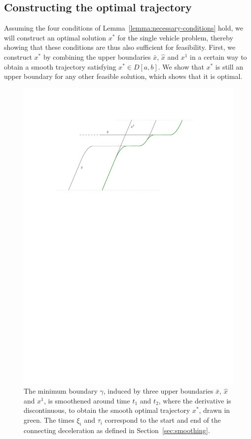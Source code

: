 \documentclass[a4paper]{article}
\theoremstyle{definition}
\theoremstyle{plain}
\begin{document}
\pagebreak

\subsection{Constructing the optimal trajectory}

Assuming the four conditions of Lemma~\ref{lemma:necessary-conditions} hold, we will construct an optimal
solution $x^{*}$ for the single vehicle problem, thereby showing that these
conditions are thus also sufficient for feasibility.
%
First, we construct $x^{*}$ by combining the upper boundaries $\bar{x}$,
$\hat{x}$ and $x^{1}$ in a certain way to obtain a smooth trajectory satisfying
$x^{*} \in D[a,b]$.
%
We show that $x^{*}$ is still an upper boundary for any other feasible solution,
which shows that it is optimal.

\begin{figure}
  \centering
  \includegraphics[scale=1]{figures/motion/rough/proof}
  \caption{The minimum boundary $\gamma$, induced by three upper boundaries
    $\bar{x}$, $\hat{x}$ and $x^{1}$, is smoothened around time $t_{1}$ and
    $t_{2}$, where the derivative is discontinuous, to obtain the smooth optimal
    trajectory $x^{*}$, drawn in green. The times $\xi_{i}$ and $\tau_{i}$
    correspond to the start and end of the connecting deceleration as
    defined in Section~\ref{sec:smoothing}.}%
  \label{fig:optimal-construction}
\end{figure}
\end{document}
